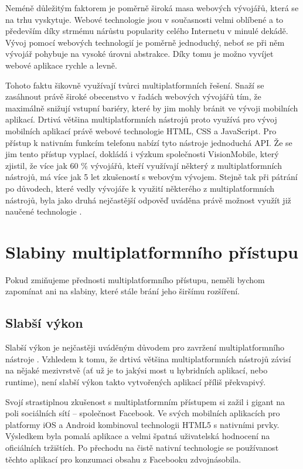 Neméně důležitým faktorem je poměrně široká masa webových vývojářů, která se na trhu vyskytuje. Webové technologie jsou v současnosti velmi oblíbené a to především díky strmému nárůstu popularity celého Internetu v minulé dekádě. Vývoj pomocí webových technologií je poměrně jednoduchý, neboť se při něm vývojář pohybuje na vysoké úrovni abstrakce. Díky tomu je možno vyvíjet webové aplikace rychle a levně.

Tohoto faktu šikovně využívají tvůrci multiplatformních řešení. Snaží se zasáhnout právě široké obecenstvo v řadách webových vývojářů tím, že maximálně snižují vstupní bariéry, které by jim mohly bránit ve vývoji mobilních aplikací. Drtivá většina multiplatformních nástrojů proto využívá pro vývoj mobilních aplikací právě webové technologie HTML, CSS a JavaScript. Pro přístup k nativním funkcím telefonu nabízí tyto nástroje jednoduchá API. Že se jim tento přístup vyplací, dokládá i výzkum společnosti VisionMobile, který zjistil, že více jak 60 \% vývojářů, kteří využívají některý z multiplatformních nástrojů, má více jak 5 let zkušeností s webovým vývojem. Stejně tak při pátrání po důvodech, které vedly vývojáře k využití některého z multiplatformních nástrojů, byla jako druhá nejčastější odpověď uváděna právě možnost využít již naučené technologie \cite{visionmobile_survey}.

\section{Slabiny multiplatformního přístupu}
Pokud zmiňujeme přednosti multiplatformního přístupu, neměli bychom zapomínat ani na slabiny, které stále brání jeho širšímu rozšíření.

\subsection{Slabší výkon}
Slabší výkon je nejčastěji uváděným důvodem pro zavržení multiplatformního nástroje \cite{visionmobile_survey}. Vzhledem k tomu, že drtivá většina multiplatformních nástrojů závisí na nějaké mezivrstvě (ať už je to jakýsi most u hybridních aplikací, nebo runtime), není slabší výkon takto vytvořených aplikací příliš překvapivý.

Svojí strastiplnou zkušenost s multiplatformním přístupem si zažil i gigant na poli sociálních sítí – společnost Facebook. Ve svých mobilních aplikacích pro platformy iOS a Android kombinoval technologii HTML5 s nativními prvky. Výsledkem byla pomalá aplikace a velmi špatná uživatelská hodnocení na oficiálních tržištích. Po přechodu na čistě nativní technologie se používanost těchto aplikací pro konzumaci obsahu z Facebooku zdvojnásobila. \cite{zuckerberg_biggest_mistake,facebook_android_obal} \\ \\

